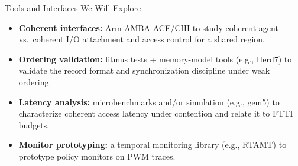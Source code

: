 \documentclass[aspectratio=169,12pt]{beamer}
\newcommand{\hl}[1]{\textcolor{Accent}{\textbf{#1}}}
\newcommand{\keyword}[1]{\textcolor{MidBlue}{\textbf{#1}}}
\newcommand{\SafetyIsland}{safety island\xspace}
\newcommand{\FTTI}{FTTI\xspace}
\begin{document}


\begin{frame}{Tools and Interfaces We Will Explore}
\begin{itemize}
\item \keyword{Coherent interfaces:} Arm AMBA ACE/CHI to study coherent agent vs.\ coherent I/O attachment and access control for a shared region.
\item \keyword{Ordering validation:} litmus tests + memory-model tools (e.g., Herd7) to validate the record format and synchronization discipline under weak ordering.
\item \keyword{Latency analysis:} microbenchmarks and/or simulation (e.g., gem5) to characterize coherent access latency under contention and relate it to \FTTI budgets.
\item \keyword{Monitor prototyping:} a temporal monitoring library (e.g., RTAMT) to prototype policy monitors on PWM traces.
\end{itemize}
\end{frame}
\end{document}
